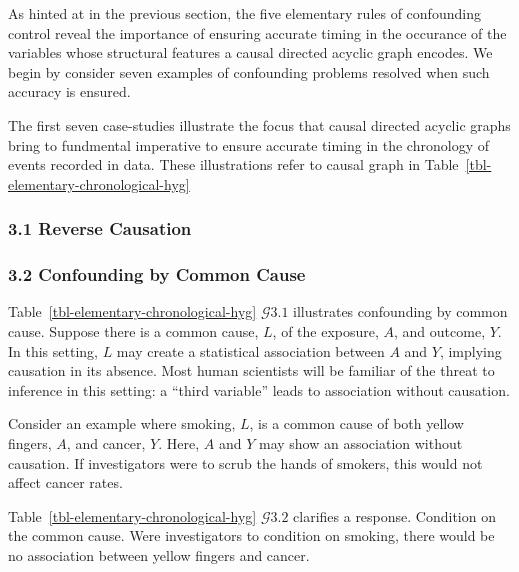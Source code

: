 \documentclass[
  single column]{article}
\begin{document}
\begin{table}

\caption{\label{tbl-elementary-chronological-hyg}}

\centering{

\captionsetup{labelsep=none}

\terminologychronologicalhygeine

}

\end{table}%

As hinted at in the previous section, the five elementary rules of
confounding control reveal the importance of ensuring accurate timing in
the occurance of the variables whose structural features a causal
directed acyclic graph encodes. We begin by consider seven examples of
confounding problems resolved when such accuracy is ensured.

The first seven case-studies illustrate the focus that causal directed
acyclic graphs bring to fundmental imperative to ensure accurate timing
in the chronology of events recorded in data. These illustrations refer
to causal graph in Table~\ref{tbl-elementary-chronological-hyg}

\subsubsection{3.1 Reverse Causation}\label{reverse-causation}

\subsubsection{3.2 Confounding by Common
Cause}\label{confounding-by-common-cause}

Table~\ref{tbl-elementary-chronological-hyg} \(\mathcal{G} 3.1\)
illustrates confounding by common cause. Suppose there is a common
cause, \(L\), of the exposure, \(A\), and outcome, \(Y\). In this
setting, \(L\) may create a statistical association between \(A\) and
\(Y\), implying causation in its absence. Most human scientists will be
familiar of the threat to inference in this setting: a ``third
variable'' leads to association without causation.

Consider an example where smoking, \(L\), is a common cause of both
yellow fingers, \(A\), and cancer, \(Y\). Here, \(A\) and \(Y\) may show
an association without causation. If investigators were to scrub the
hands of smokers, this would not affect cancer rates.

Table~\ref{tbl-elementary-chronological-hyg} \(\mathcal{G} 3.2\)
clarifies a response. Condition on the common cause. Were investigators
to condition on smoking, there would be no association between yellow
fingers and cancer.
\end{document}
